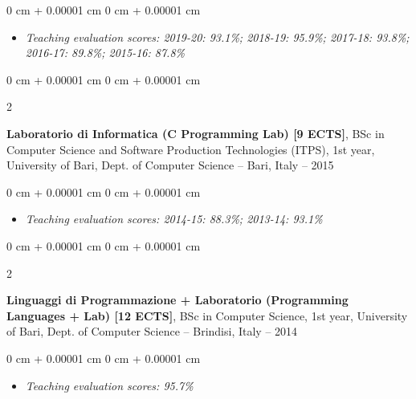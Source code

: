 \documentclass[10pt, a4paper]{article}
\newenvironment{highlights}{
    \begin{itemize}[
        topsep=0.10 cm,
        parsep=0.10 cm,
        partopsep=0pt,
        itemsep=0pt,
        leftmargin=0 cm + 10pt
    ]
}{
    \end{itemize}
} %
\newenvironment{onecolentry}{
    \begin{adjustwidth}{
        0 cm + 0.00001 cm
    }{
        0 cm + 0.00001 cm
    }
}{
    \end{adjustwidth}
} %
\newenvironment{twocolentry}[2][]{
    \onecolentry
    \def\secondColumn{#2}
    \setcolumnwidth{\fill, 4.5 cm}
    \begin{paracol}{2}
}{
    \switchcolumn \raggedleft \secondColumn
    \end{paracol}
    \endonecolentry
} %
\begin{document}
        \vspace{0.10 cm}
        \begin{onecolentry}
            \begin{highlights}
                \item \textit{Teaching evaluation scores: 2019-20: 93.1\%; 2018-19: 95.9\%; 2017-18: 93.8\%; 2016-17: 89.8\%; 2015-16: 87.8\%}
            \end{highlights}
        \end{onecolentry}


        \vspace{0.2 cm}

        \begin{twocolentry}{
            2013 – 2015
        }
            \textbf{Laboratorio di Informatica (C Programming Lab) [9 ECTS]}, BSc in Computer Science and Software Production Technologies (ITPS), 1st year, University of Bari, Dept. of Computer Science -- Bari, Italy\end{twocolentry}

        \vspace{0.10 cm}
        \begin{onecolentry}
            \begin{highlights}
                \item \textit{Teaching evaluation scores: 2014-15: 88.3\%; 2013-14: 93.1\%}
            \end{highlights}
        \end{onecolentry}


        \vspace{0.2 cm}

        \begin{twocolentry}{
            2013 – 2014
        }
            \textbf{Linguaggi di Programmazione + Laboratorio (Programming Languages + Lab) [12 ECTS]}, BSc in Computer Science, 1st year, University of Bari, Dept. of Computer Science -- Brindisi, Italy\end{twocolentry}

        \vspace{0.10 cm}
        \begin{onecolentry}
            \begin{highlights}
                \item \textit{Teaching evaluation scores: 95.7\%}
            \end{highlights}
        \end{onecolentry}


        \vspace{0.2 cm}
\end{document}
